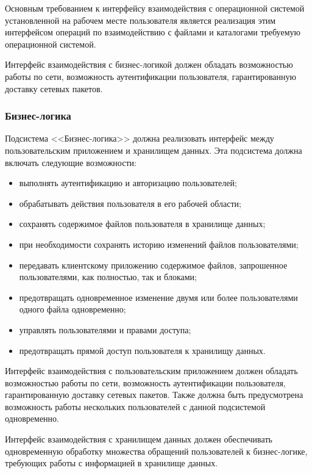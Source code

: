 \documentclass[utf8,usehyperref,12pt]{G7-32}
\begin{document}
Основным требованием к интерфейсу взаимодействия с операционной системой установленной на рабочем месте пользователя является реализация этим интерфейсом операций по взаимодействию с файлами и каталогами требуемую операционной системой.

Интерфейс взаимодействия с бизнес-логикой должен обладать возможностью работы по сети, возможность аутентификации пользователя, гарантированную доставку сетевых пакетов.

\subsubsection{Бизнес-логика}

Подсистема <<Бизнес-логика>> должна реализовать интерфейс между пользовательским приложением и хранилищем данных. Эта подсистема должна включать следующие возможности:
\begin{itemize}
 \item выполнять аутентификацию и авторизацию пользователей;
 \item обрабатывать действия пользователя в его рабочей области;
 \item сохранять содержимое файлов пользователя в хранилище данных;
 \item при необходимости сохранять историю изменений файлов пользователями;
 \item передавать клиентскому приложению содержимое файлов, запрошенное пользователями, как полностью, так и блоками;
 \item предотвращать одновременное изменение двумя или более пользователями одного файла одновременно;
 \item управлять пользователями и правами доступа;
 \item предотвращать прямой доступ пользователя к хранилищу данных.
\end{itemize}

Интерфейс взаимодействия с пользовательским приложением должен обладать возможностью работы по сети, возможность аутентификации пользователя, гарантированную доставку сетевых пакетов. Также должна быть предусмотрена возможность работы нескольких пользователей с данной подсистемой одновременно.

Интерфейс взаимодействия с хранилищем данных должен обеспечивать одновременную обработку множества обращений пользователей к бизнес-логике, требующих работы с информацией в хранилище данных. 
\end{document}
